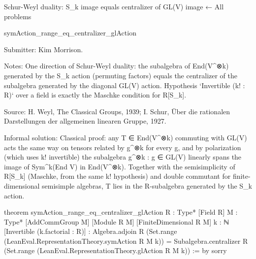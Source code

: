 Schur-Weyl duality: S_k image equals centralizer of GL(V) image
← All problems

symAction_range_eq_centralizer_glAction

Submitter: Kim Morrison.

Notes: One direction of Schur-Weyl duality: the subalgebra of End(V^⊗k) generated by the S_k action (permuting factors) equals the centralizer of the subalgebra generated by the diagonal GL(V) action. Hypothesis `Invertible (k! : R)` over a field is exactly the Maschke condition for R[S_k].

Source: H. Weyl, The Classical Groups, 1939; I. Schur, Über die rationalen Darstellungen der allgemeinen linearen Gruppe, 1927.

Informal solution: Classical proof: any T ∈ End(V^⊗k) commuting with GL(V) acts the same way on tensors related by g^⊗k for every g, and by polarization (which uses k! invertible) the subalgebra {g^⊗k : g ∈ GL(V)} linearly spans the image of Sym^k(End V) in End(V^⊗k). Together with the semisimplicity of R[S_k] (Maschke, from the same k! hypothesis) and double commutant for finite-dimensional semisimple algebras, T lies in the R-subalgebra generated by the S_k action.

theorem symAction_range_eq_centralizer_glAction {R : Type*} [Field R]
    {M : Type*} [AddCommGroup M] [Module R M] [FiniteDimensional R M]
    {k : ℕ} [Invertible (k.factorial : R)] :
    Algebra.adjoin R (Set.range (LeanEval.RepresentationTheory.symAction R M k)) =
      Subalgebra.centralizer R (Set.range (LeanEval.RepresentationTheory.glAction R M k)) := by
  sorry
